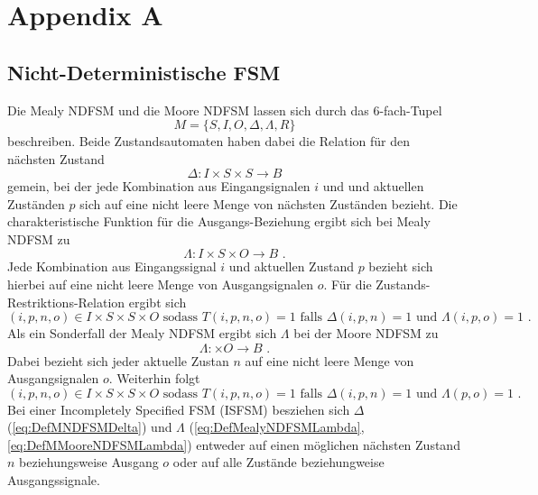 \chapter{Appendix A}
\label{chap:AppendixA}
\section{Nicht-Deterministische FSM}
\label{sec:NDFSM}
Die Mealy NDFSM und die Moore NDFSM lassen sich durch das 6-fach-Tupel
\begin{equation}
M = \{S,I,O,\Delta,\Lambda,R\}
\label{eq:DefMNDFSM}
\end{equation}
beschreiben. Beide Zustandsautomaten haben dabei die Relation für den nächsten Zustand
\begin{equation}
\Delta: I \times S \times S \xrightarrow{} B
\label{eq:DefMNDFSMDelta}
\end{equation}
gemein, bei der jede Kombination aus Eingangsignalen $i$ und und aktuellen Zuständen $p$ sich auf eine nicht leere Menge von nächsten Zuständen bezieht. Die charakteristische Funktion für die Ausgangs-Beziehung ergibt sich bei Mealy NDFSM zu 
\begin{equation}
\Lambda: I \times S \times O \xrightarrow{} B \text{ .}
\label{eq:DefMealyNDFSMLambda}
\end{equation}
Jede Kombination aus Eingangssignal $i$ und aktuellen Zustand $p$ bezieht sich hierbei auf eine nicht leere Menge von Ausgangsignalen $o$. Für die Zustands-Restriktions-Relation ergibt sich
\begin{equation}
(i,p,n,o) \in I \times S \times S \times O \text{ sodass } T(i,p,n,o)=1 \text{ falls } \Delta(i,p,n)=1 \text{ und } \Lambda(i,p,o)=1 \text{ .}
\label{re:CondMealyNDFSMT}
\end{equation}
Als ein Sonderfall der Mealy NDFSM ergibt sich $\Lambda$ bei der Moore NDFSM zu
\begin{equation}
\Lambda: \times O \xrightarrow{} B \text{ .}
\label{eq:DefMMooreNDFSMLambda}
\end{equation} 
Dabei bezieht sich jeder aktuelle Zustan $n$ auf eine nicht leere Menge von Ausgangsignalen $o$. Weiterhin folgt 
\begin{equation}
(i,p,n,o) \in I \times S \times S \times O \text{ sodass } T(i,p,n,o)=1 \text{ falls } \Delta(i,p,n)=1 \text{ und } \Lambda(p,o)=1 \text{ .}
\label{eq:CondMooreNDFSMT}
\end{equation}
Bei einer Incompletely Specified FSM (ISFSM) besziehen sich $\Delta$ (\ref{eq:DefMNDFSMDelta}) und $\Lambda$ (\ref{eq:DefMealyNDFSMLambda}, \ref{eq:DefMMooreNDFSMLambda}) entweder auf einen möglichen nächsten Zustand $n$ beziehungsweise Ausgang $o$ oder auf alle Zustände beziehungweise Ausgangssignale.